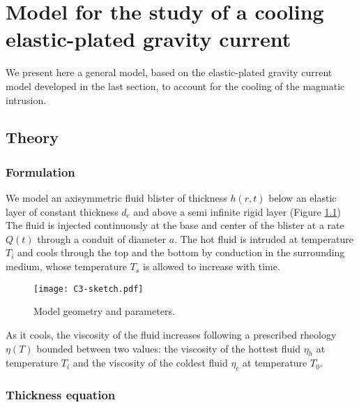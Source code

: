 \chapter{Model  for  the study  of  a  cooling elastic-plated  gravity
  current}
\label{chap3}
\minitoc

We present here  a general model, based on  the elastic-plated gravity
current  model developed  in  the  last section,  to  account for  the
cooling of the magmatic intrusion.

\section{Theory}
\label{C3-sec:theory}

\subsection{Formulation}
\label{C3-sec:formulation}

We model an axisymmetric fluid  blister of thickness $h(r,t)$ below an
elastic layer  of constant thickness  $d_c$ and above a  semi infinite
rigid layer \citep{Michaut:2011kg}  (Figure \ref{C3-sketch}) The fluid
is injected  continuously at the base  and center of the  blister at a
rate $Q(t)$  through a  conduit of  diameter $a$.  The hot  fluid is
intruded at temperature $T_i$ and cools through the top and the bottom
by conduction  in the surrounding  medium, whose temperature  $T_s$ is
allowed to increase with time.

\begin{figure}[htbp]
  \begin{center}
    \graphicspath{ {/Users/thorey/Documents/These/Manuscript/Figure/Chapter3/} }
    \texttt{[image: C3-sketch.pdf]}
    \caption{Model geometry and parameters.}
    \label{C3-sketch}
  \end{center}
\end{figure}

As  it  cools,  the  viscosity  of the  fluid  increases  following  a
prescribed  rheology   $\eta(T)$  bounded  between  two   values:  the
viscosity of the  hottest fluid $\eta_h$ at temperature  $T_i$ and the
viscosity of the coldest fluid $\eta_c$ at temperature $T_0$.

\subsection{Thickness equation}

